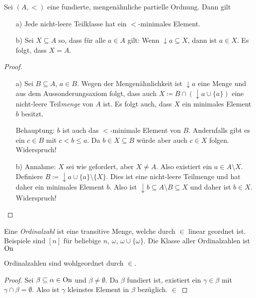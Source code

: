 \begin{satz}[Induktionsprinzip]
	Sei $(A,<)$ eine fundierte, mengenähnliche partielle Ordnung. Dann gilt
	\begin{itemize}
		\item[a)] Jede nicht-leere Teilklasse hat ein $<$-minimales Element.
		\item[b)] Sei $X\subseteq A$ so, dass für alle $a\in A$ gilt: Wenn $\downarrow a \subseteq X$, dann ist $a\in X$. Es folgt, dass $X=A$.
	\end{itemize}
\end{satz}
\begin{proof}
	\begin{itemize}
		\item[a)] Sei $B\subseteq A$, $a\in B$. Wegen der Mengenähnlichkeit ist $\downarrow a$ eine Menge und aus dem Aussonderungsaxiom folgt, dass auch $X\coloneqq B \cap (\downarrow a \cup \{a\})$ eine nicht-leere Teil\textit{menge} von $A$ ist. Es folgt auch, dass $X$ ein minimales Element $b$ besitzt. 
		
		Behauptung: $b$ ist auch das $<$-minimale Element von $B$. Andernfalls gibt es ein $c\in B$ mit $c < b \leq a$. Da $b\in X \subseteq B$ würde aber auch $c\in X$ folgen. Widerspruch!
		
		\item[b)] Annahme: $X$ sei wie gefordert, aber $X\neq A$. Also existiert ein $a\in A\setminus X$. Definiere $B\coloneqq \downarrow a \cup \{a\} \setminus \{X\}$. Dies ist eine nicht-leere Teilmenge und hat daher ein minimales Element $b$. Also ist $\downarrow b\subseteq A\setminus B\subseteq X$ und daher ist $b\in X$. Widerspruch!
	\end{itemize}
\end{proof}

\begin{definition}[Ordinalzahlen]
	Eine \textit{Ordinalzahl} ist eine transitive Menge, welche durch $\in$ linear geordnet ist. 
	Beispiele sind $[n]$ für beliebige $n$, $\omega$, $\omega \cup \{\omega\}$. Die Klasse aller Ordinalzahlen ist $\operatorname{On}$
\end{definition}

\begin{lemma}
	Ordinalzahlen sind wohlgeordnet durch $\in$.
\end{lemma}
\begin{proof}
	Sei $\beta\subseteq \alpha\in \operatorname{On}$ und $\beta\neq \emptyset$. Da $\beta$ fundiert ist, existiert ein $\gamma\in \beta$ mit $\gamma\cap \beta =\emptyset$. Also ist $\gamma$ kleinstes Element in $\beta$ bezüglich. $\in$
\end{proof}

